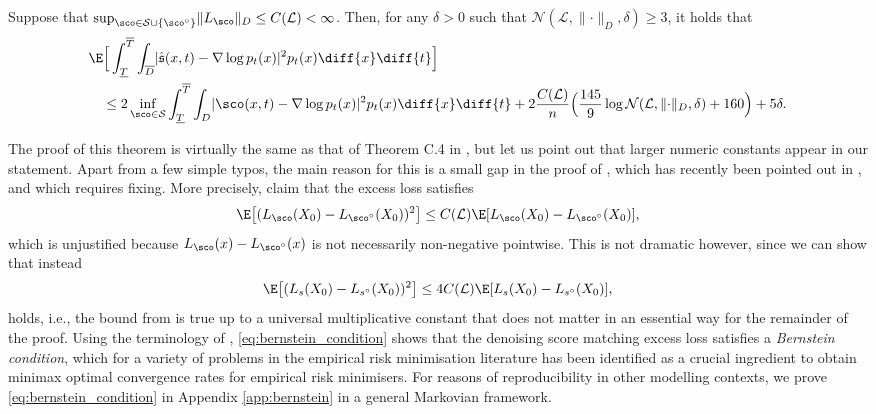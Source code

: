 \documentclass[a4paper, 11pt, headings = small, abstract]{scrartcl}
\begin{document}
\begin{theorem}\label{theo:score_loss_emp}
Suppose that $\sup_{\sco \in \mathcal{S} \cup \{\sco^\circ\}} \lVert L_{\sco} \rVert_{D} \leq C(\mathcal{L}) < \infty$.  Then, for any $\delta > 0$ such that $\mathcal{N}(\mathcal{L},\lVert \cdot \rVert_D, \delta) \geq 3$, it holds that
\begin{equation*} 
\begin{split}
&\E\Big[\int_{\underline{T}}^{\overline{T}} \int_{\overline{D}} \lvert \hat{\mathfrak{s}}(x,t) - \nabla \log p_t(x) \rvert^2 p_t(x) \diff{x} \diff{t}  \Big] \\ 
&\quad \leq 2 \inf_{\sco \in \mathcal{S}} \int_{\underline{T}}^{\overline{T}} \int_{D} \lvert \sco(x,t) - \nabla \log p_t(x) \rvert^2 p_t(x) \diff{x} \diff{t} + 2\frac{C(\mathcal{L})}{n}\Big(\frac{145}{9}\log \mathcal{N}(\mathcal{L}, \lVert \cdot \rVert_{D}, \delta) + 160\Big) + 5\delta.
\end{split}
\end{equation*}
\end{theorem}
The proof of this theorem is virtually the same as that of Theorem C.4 in \cite{oko23}, but let us point out that larger numeric constants appear in our statement. Apart from a few simple typos, the main reason for this is a small gap in the proof of \cite[Theorem C.4]{oko23}, which has recently been pointed out in \cite{yakovlev25}, and which requires fixing. More precisely, \cite{oko23}  claim that the excess loss satisfies
\[\E\big[(L_\sco(X_0) - L_{\sco^\circ}(X_0))^2\big] \leq C(\mathcal{L})\E[L_\sco(X_0) - L_{\sco^\circ}(X_0)],\]
which is unjustified because $L_\sco(x) - L_{\sco^\circ}(x)$ is not necessarily non-negative pointwise. This is not dramatic however, since we can show that instead
\begin{equation}\label{eq:bernstein_condition}
\E\big[(L_s(X_0) - L_{s^\circ}(X_0))^2\big] \leq 4 C(\mathcal{L})\E[L_s(X_0) - L_{s^\circ}(X_0)],
\end{equation}
holds, i.e., the  bound from \cite{oko23} is true up to a universal multiplicative constant that does not matter in an essential way for the remainder of the proof. 
Using the terminology of \cite{bartlett05}, \eqref{eq:bernstein_condition} shows that the denoising score matching excess loss satisfies a \textit{Bernstein condition}, which for a variety of problems in the empirical risk minimisation literature has been identified as a crucial ingredient  to obtain minimax optimal convergence rates for empirical risk minimisers. For reasons of reproducibility  in other modelling contexts, we prove \eqref{eq:bernstein_condition}  in Appendix \ref{app:bernstein} in a general Markovian framework. 
\end{document}
